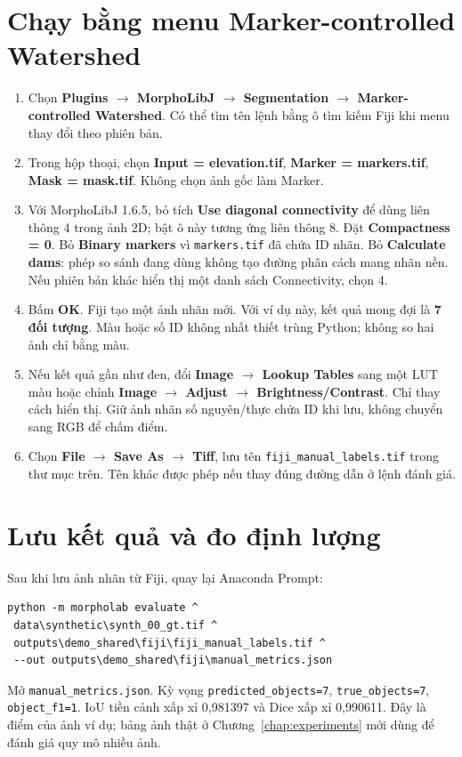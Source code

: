 \section{Chạy bằng menu Marker-controlled Watershed}
\label{sec:fiji-menu}
\begin{enumerate}[leftmargin=*,itemsep=5pt]
\item Chọn \textbf{Plugins $\to$ MorphoLibJ $\to$ Segmentation $\to$ Marker-controlled Watershed}. Có thể tìm tên lệnh bằng ô tìm kiếm Fiji khi menu thay đổi theo phiên bản.
\item Trong hộp thoại, chọn \textbf{Input = elevation.tif}, \textbf{Marker = markers.tif}, \textbf{Mask = mask.tif}. Không chọn ảnh gốc làm Marker.
\item Với MorphoLibJ 1.6.5, bỏ tích \textbf{Use diagonal connectivity} để dùng liên thông 4 trong ảnh 2D; bật ô này tương ứng liên thông 8. Đặt \textbf{Compactness = 0}. Bỏ \textbf{Binary markers} vì \texttt{markers.tif} đã chứa ID nhãn. Bỏ \textbf{Calculate dams}: phép so sánh đang dùng không tạo đường phân cách mang nhãn nền. Nếu phiên bản khác hiển thị một danh sách Connectivity, chọn 4.
\item Bấm \textbf{OK}. Fiji tạo một ảnh nhãn mới. Với ví dụ này, kết quả mong đợi là \textbf{7 đối tượng}. Màu hoặc số ID không nhất thiết trùng Python; không so hai ảnh chỉ bằng màu.
\item Nếu kết quả gần như đen, đổi \textbf{Image $\to$ Lookup Tables} sang một LUT màu hoặc chỉnh \textbf{Image $\to$ Adjust $\to$ Brightness/Contrast}. Chỉ thay cách hiển thị. Giữ ảnh nhãn số nguyên/thực chứa ID khi lưu, không chuyển sang RGB để chấm điểm.
\item Chọn \textbf{File $\to$ Save As $\to$ Tiff}, lưu tên \texttt{fiji\_manual\_labels.tif} trong thư mục trên. Tên khác được phép nếu thay đúng đường dẫn ở lệnh đánh giá.
\end{enumerate}

\section{Lưu kết quả và đo định lượng}
\label{sec:fiji-measure}
Sau khi lưu ảnh nhãn từ Fiji, quay lại Anaconda Prompt:
\begin{lstlisting}[language={},numbers=none]
python -m morpholab evaluate ^
 data\synthetic\synth_00_gt.tif ^
 outputs\demo_shared\fiji\fiji_manual_labels.tif ^
 --out outputs\demo_shared\fiji\manual_metrics.json
\end{lstlisting}
Mở \texttt{manual\_metrics.json}. Kỳ vọng \texttt{predicted\_objects=7}, \texttt{true\_objects=7}, \texttt{object\_f1=1}. IoU tiền cảnh xấp xỉ 0,981397 và Dice xấp xỉ 0,990611. Đây là điểm của ảnh ví dụ; bảng ảnh thật ở Chương~\ref{chap:experiments} mới dùng để đánh giá quy mô nhiều ảnh.

